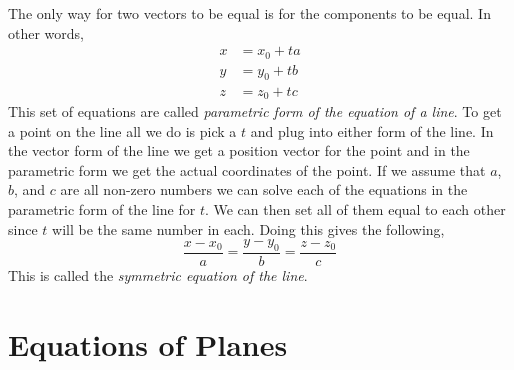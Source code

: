 \documentclass[10pt,reqno]{book}
\theoremstyle{definition}
\begin{document}
	The only way for two vectors to be equal is for the components to be equal. In other words,
	\begin{align*}
		x &= x_0 + ta\\
		y &= y_0 + tb\\
		z &= z_0 + tc
	\end{align*}
	This set of equations are called \textit{parametric form of the equation of a line}. To get a point on the line all we do is pick a $ t $ and plug into either form of the line. In the vector form of the line we get a position vector for the point and in the parametric form we get the actual coordinates of the point. If we assume that $a$, $b$, and $c$ are all non-zero numbers we can solve each of the equations in the parametric form of the line for $t$. We can then set all of them equal to each other since $t$ will be the same number in each. Doing this gives the following,
	\[ \frac{x - x_0}{a} = \frac{y - y_0}{b} = \frac{z - z_0}{c} \]
	This is called the \textit{symmetric equation of the line}.
	
	\section{Equations of Planes}
	
\end{document}
